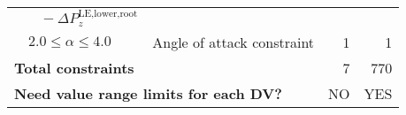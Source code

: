 \begin{table}[!ht]
{\begin{tabular}{lllrr}
        \multicolumn{1}{l}{} &  $\;\;\;-\Delta P^{\text{LE,lower,root}}_z$ &        &        &  \\
        \multicolumn{1}{r}{} & $2.0 \leq \alpha \leq 4.0$ & Angle of attack constraint & 1      &  1 \\
        \hline
        \multicolumn{3}{l}{\textbf{Total constraints}} & 7      & 770 \\
        \hline
        \multicolumn{3}{l}{\textbf{Need value range limits for each DV?}} & NO     & YES \\
        \hline
        \end{tabular}%
    }
  \label{ch5:tab:crm_DV_cons}%
\end{table}%